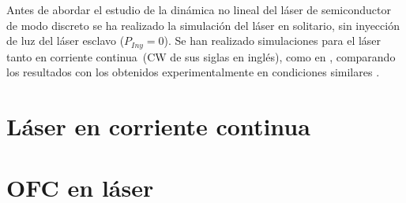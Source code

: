 \graphicspath{{../Graphics/Cpt1-Charactz/}}

\newcommand{\cw}{corriente continua}

Antes de abordar el estudio de la dinámica no lineal del láser de semiconductor de modo discreto se ha realizado la simulación del láser en solitario, sin inyección de luz del láser esclavo ($P_{Iny} = 0$). Se han realizado simulaciones para el láser tanto en \cw\ (CW de sus siglas en inglés), como en \gs, comparando los resultados con los obtenidos experimentalmente en condiciones similares \cite{Chaves19}.

	\section{Láser en \cw}
		\label{Sol:CW}
		
		

	\section{OFC en l\'aser \gs}
		\label{Sol:OFC}

		

